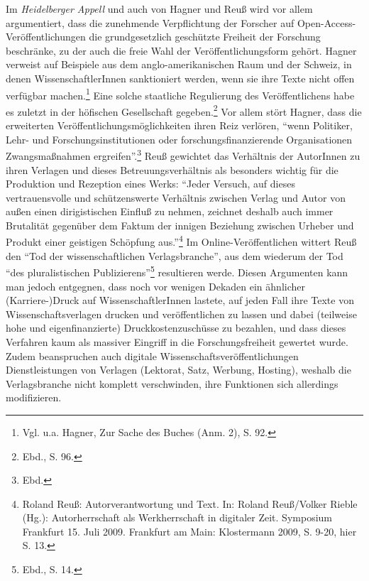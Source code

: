 \documentclass[a4paper,
fontsize=11pt,
oneside,
numbers=noperiodatend,
parskip=half-,
bibliography=totoc,
final
]{scrartcl}
\begin{document}
Im \emph{Heidelberger Appell} und auch von Hagner und Reuß wird vor
allem argumentiert, dass die zunehmende Verpflichtung der Forscher auf
Open-Access-Veröffentlichungen die grundgesetzlich geschützte Freiheit
der Forschung beschränke, zu der auch die freie Wahl der
Veröffentlichungsform gehört. Hagner verweist auf Beispiele aus dem
anglo-amerikanischen Raum und der Schweiz, in denen WissenschaftlerInnen
sanktioniert werden, wenn sie ihre Texte nicht offen verfügbar
machen.\footnote{Vgl. u.a. Hagner, Zur Sache des Buches (Anm. 2), S. 92.}
Eine solche staatliche Regulierung des Veröffentlichens habe es zuletzt
in der höfischen Gesellschaft gegeben.\footnote{Ebd., S. 96.} Vor allem
stört Hagner, dass die erweiterten Veröffentlichungsmöglichkeiten ihren
Reiz verlören, \enquote{wenn Politiker, Lehr- und
Forschungsinstitutionen oder forschungsfinanzierende Organisationen
Zwangsmaßnahmen ergreifen}.\footnote{Ebd.} Reuß gewichtet das Verhältnis
der AutorInnen zu ihren Verlagen und dieses Betreuungsverhältnis als
besonders wichtig für die Produktion und Rezeption eines Werks:
\enquote{Jeder Versuch, auf dieses vertrauensvolle und schützenswerte
Verhältnis zwischen Verlag und Autor von außen einen dirigistischen
Einfluß zu nehmen, zeichnet deshalb auch immer Brutalität gegenüber dem
Faktum der innigen Beziehung zwischen Urheber und Produkt einer
geistigen Schöpfung aus.}\footnote{Roland Reuß: Autorverantwortung und
  Text. In: Roland Reuß/Volker Rieble (Hg.): Autorherrschaft als
  Werkherrschaft in digitaler Zeit. Symposium Frankfurt 15. Juli 2009.
  Frankfurt am Main: Klostermann 2009, S. 9-20, hier S. 13.} Im
Online-Veröffentlichen wittert Reuß den \enquote{Tod der
wissenschaftlichen Verlagsbranche}, aus dem wiederum der Tod
\enquote{des pluralistischen Publizierens}\footnote{Ebd., S. 14.}
resultieren werde. Diesen Argumenten kann man jedoch entgegnen, dass
noch vor wenigen Dekaden ein ähnlicher (Karriere-)Druck auf
WissenschaftlerInnen lastete, auf jeden Fall ihre Texte von
Wissenschaftsverlagen drucken und veröffentlichen zu lassen und dabei
(teilweise hohe und eigenfinanzierte) Druckkostenzuschüsse zu bezahlen,
und dass dieses Verfahren kaum als massiver Eingriff in die
Forschungsfreiheit gewertet wurde. Zudem beanspruchen auch digitale
Wissenschaftsveröffentlichungen Dienstleistungen von Verlagen (Lektorat,
Satz, Werbung, Hosting), weshalb die Verlagsbranche nicht komplett
verschwinden, ihre Funktionen sich allerdings modifizieren.
\end{document}
